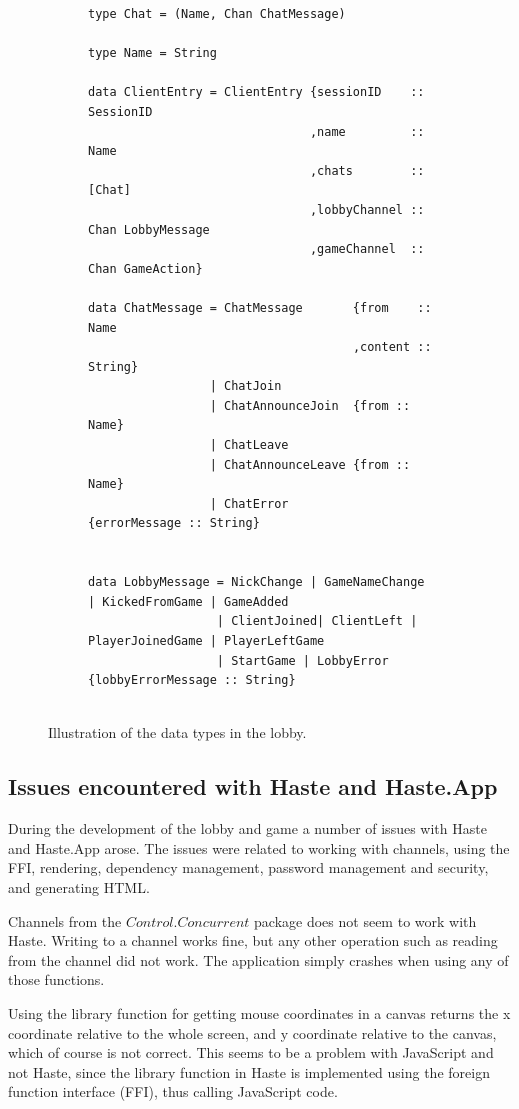 \documentclass[a4paper]{article}
\begin{document}
\begin{figure}[ht!]
\begin{subfigure}{\textwidth}
\begin{lstlisting}
type Chat = (Name, Chan ChatMessage)

type Name = String

data ClientEntry = ClientEntry {sessionID    :: SessionID
                               ,name         :: Name
                               ,chats        :: [Chat]
                               ,lobbyChannel :: Chan LobbyMessage
                               ,gameChannel  :: Chan GameAction}

data ChatMessage = ChatMessage       {from    :: Name
                                     ,content :: String}
                 | ChatJoin
                 | ChatAnnounceJoin  {from :: Name}
                 | ChatLeave
                 | ChatAnnounceLeave {from :: Name}
                 | ChatError         {errorMessage :: String}


data LobbyMessage = NickChange | GameNameChange | KickedFromGame | GameAdded 
                  | ClientJoined| ClientLeft | PlayerJoinedGame | PlayerLeftGame 
                  | StartGame | LobbyError {lobbyErrorMessage :: String}


        \end{lstlisting}
    \end{subfigure}
    \caption{Illustration of the data types in the lobby.}
    \label{fig:datatypes}
\end{figure}


\subsection{Issues encountered with Haste and Haste.App}
\label{sub:issues-during-development}
During the development of the lobby and game a number of issues with Haste and Haste.App arose. The issues were related to working with channels, using the FFI, rendering, dependency management, password management and security, and generating HTML. %

Channels from the $Control.Concurrent$ package does not seem to work with Haste. Writing to a channel works fine, but any other operation such as reading from the channel did not work. The application simply crashes when using any of those functions. 

Using the library function for getting mouse coordinates in a canvas returns the x coordinate relative to the whole screen, and y coordinate relative to the canvas, which of course is not correct. This seems to be a problem with JavaScript and not Haste, since the library function in Haste is implemented using the foreign function interface (FFI), thus calling JavaScript code.
\end{document}

